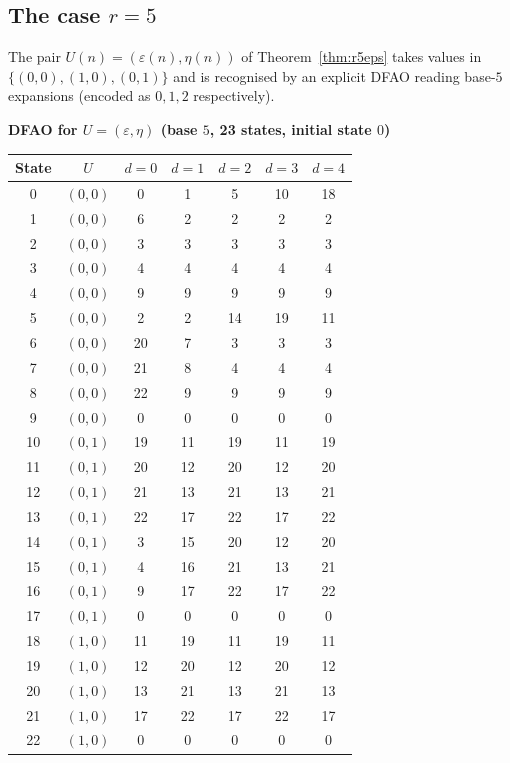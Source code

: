 \documentclass[12pt]{article}
\theoremstyle{definition}
\theoremstyle{remark}
\begin{document}
\subsection*{The case $r=5$}

The pair $U(n)=(\varepsilon(n),\eta(n))$ of Theorem~\ref{thm:r5eps} takes values
in $\{(0,0),(1,0),(0,1)\}$ and is recognised by an explicit DFAO reading
base-$5$ expansions (encoded as $0,1,2$ respectively).

\noindent\begin{minipage}{\linewidth}
\textbf{DFAO for $U=(\varepsilon,\eta)$ (base $5$, 23 states, initial state $0$)}

\begin{center}
\renewcommand{\arraystretch}{1.1}
\begin{tabular}{c|c|ccccc}
State & $U$ & $d=0$ & $d=1$ & $d=2$ & $d=3$ & $d=4$ \\\hline
0 & $(0,0)$ & 0 & 1 & 5 & 10 & 18 \\
1 & $(0,0)$ & 6 & 2 & 2 & 2 & 2 \\
2 & $(0,0)$ & 3 & 3 & 3 & 3 & 3 \\
3 & $(0,0)$ & 4 & 4 & 4 & 4 & 4 \\
4 & $(0,0)$ & 9 & 9 & 9 & 9 & 9 \\
5 & $(0,0)$ & 2 & 2 & 14 & 19 & 11 \\
6 & $(0,0)$ & 20 & 7 & 3 & 3 & 3 \\
7 & $(0,0)$ & 21 & 8 & 4 & 4 & 4 \\
8 & $(0,0)$ & 22 & 9 & 9 & 9 & 9 \\
9 & $(0,0)$ & 0 & 0 & 0 & 0 & 0 \\
10 & $(0,1)$ & 19 & 11 & 19 & 11 & 19 \\
11 & $(0,1)$ & 20 & 12 & 20 & 12 & 20 \\
12 & $(0,1)$ & 21 & 13 & 21 & 13 & 21 \\
13 & $(0,1)$ & 22 & 17 & 22 & 17 & 22 \\
14 & $(0,1)$ & 3 & 15 & 20 & 12 & 20 \\
15 & $(0,1)$ & 4 & 16 & 21 & 13 & 21 \\
16 & $(0,1)$ & 9 & 17 & 22 & 17 & 22 \\
17 & $(0,1)$ & 0 & 0 & 0 & 0 & 0 \\
18 & $(1,0)$ & 11 & 19 & 11 & 19 & 11 \\
19 & $(1,0)$ & 12 & 20 & 12 & 20 & 12 \\
20 & $(1,0)$ & 13 & 21 & 13 & 21 & 13 \\
21 & $(1,0)$ & 17 & 22 & 17 & 22 & 17 \\
22 & $(1,0)$ & 0 & 0 & 0 & 0 & 0 \\
\end{tabular}
\end{center}
\end{minipage}
\bigskip
\end{document}
